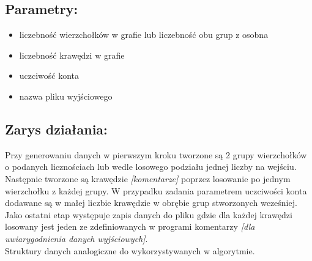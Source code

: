 \documentclass[11pt]{article} %
\begin{document}
\subsection{Parametry:}
\begin{itemize}
\item
liczebność wierzchołków w grafie lub liczebność obu grup z osobna
\item
liczebność krawędzi w grafie
\item
uczciwość konta
\item
nazwa pliku wyjściowego
\end{itemize}
\subsection{Zarys działania:}
  Przy generowaniu danych w pierwszym kroku tworzone są 2 grupy wierzchołków o podanych licznościach lub wedle losowego podziału jednej liczby na wejściu. Następnie tworzone są krawędzie \textsl{[komentarze]} poprzez losowanie po jednym wierzchołku z każdej grupy. W przypadku zadania parametrem uczciwości konta dodawane są w małej liczbie krawędzie w obrębie grup stworzonych wcześniej. Jako ostatni etap występuje zapis danych do pliku gdzie dla każdej krawędzi losowany jest jeden ze zdefiniowanych w programi komentarzy \textsl{[dla uwiarygodnienia danych wyjściowych]}.\\
  Struktury danych analogiczne do wykorzystywanych w algorytmie.
\end{document}
